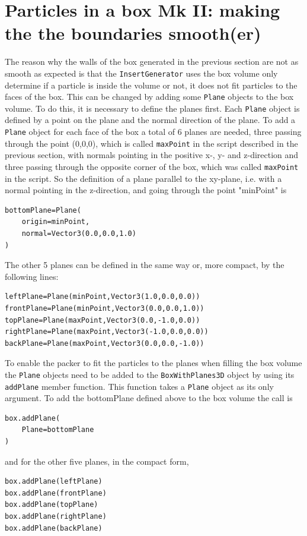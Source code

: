 \section{Particles in a box Mk II: making the the boundaries smooth(er)}
\label{sec:gengeo_box2}
The reason why the walls of the box generated in the previous section are not as smooth as expected is that the \texttt{InsertGenerator} uses the box volume only determine if a particle is inside the volume or not, it does not fit particles to the faces of the box. This can be changed by adding some \texttt{Plane} objects to the box volume. To do this, it is necessary to define the planes first. Each \texttt{Plane} object is defined by a point on the plane and the normal direction of the plane. To add a  \texttt{Plane} object for each face of the box a total of 6 planes are needed, three passing through the point (0,0,0), which is called \texttt{maxPoint} in the script described in the previous section, with normals pointing in the positive x-, y- and z-direction and three passing through the opposite corner of the box, which was called \texttt{maxPoint} in the script. So the definition of a plane parallel to the xy-plane, i.e. with a normal pointing in the z-direction, and going through the point "minPoint" is
\begin{verbatim}
bottomPlane=Plane(
    origin=minPoint,
    normal=Vector3(0.0,0.0,1.0)
)
\end{verbatim} 
The other 5 planes can be defined in the same way or, more compact, by the following lines:
\begin{verbatim}
leftPlane=Plane(minPoint,Vector3(1.0,0.0,0.0))
frontPlane=Plane(minPoint,Vector3(0.0,0.0,1.0))
topPlane=Plane(maxPoint,Vector3(0.0,-1.0,0.0))
rightPlane=Plane(maxPoint,Vector3(-1.0,0.0,0.0))
backPlane=Plane(maxPoint,Vector3(0.0,0.0,-1.0))
\end{verbatim}
To enable the packer to fit the particles to the planes when filling the box volume the \texttt{Plane} objects need to be added to the \texttt{BoxWithPlanes3D} object by using its \texttt{addPlane} member function. This function takes a \texttt{Plane} object as its only argument. To add the bottomPlane defined above to the box volume the call is 
\begin{verbatim}
box.addPlane(
    Plane=bottomPlane
)
\end{verbatim}
and for the other five planes, in the compact form,
\begin{verbatim}
box.addPlane(leftPlane)
box.addPlane(frontPlane)
box.addPlane(topPlane)
box.addPlane(rightPlane)
box.addPlane(backPlane)
\end{verbatim}
